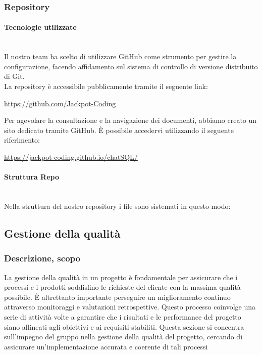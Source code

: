 \documentclass{article}
\begin{document}
    \subsubsection{Repository}
    \paragraph{Tecnologie utilizzate}~\\
    Il nostro team ha scelto di utilizzare GitHub come strumento per gestire la configurazione, facendo affidamento sul sistema di controllo di versione distribuito di Git.\\
    La repository è accessibile pubblicamente tramite il seguente link:\\
    \begin{center}
    \url{https://github.com/Jackpot-Coding}\\
    \end{center}
    Per agevolare la consultazione e la navigazione dei documenti, abbiamo creato un sito dedicato tramite GitHub. È possibile accedervi utilizzando il seguente riferimento:\\
    \begin{center}
    \url{https://jackpot-coding.github.io/chatSQL/}\\
    \end{center}
    \paragraph{Struttura Repo}~\\
    Nella struttura del nostro repository i file sono sistemati in questo modo:\\
    


\subsection{Gestione della qualità}
    \subsubsection{Descrizione, scopo}
    La gestione della qualità in un progetto è fondamentale per assicurare che i processi e i prodotti soddisfino le richieste del cliente con la massima qualità possibile. È altrettanto importante perseguire un miglioramento continuo attraverso monitoraggi e valutazioni retrospettive. Questo processo coinvolge una serie di attività volte a garantire che i risultati e le performance del progetto siano allineati agli obiettivi e ai requisiti stabiliti. Questa sezione si concentra sull'impegno del gruppo nella gestione della qualità del progetto, cercando di assicurare un'implementazione accurata e coerente di tali processi
\end{document}
